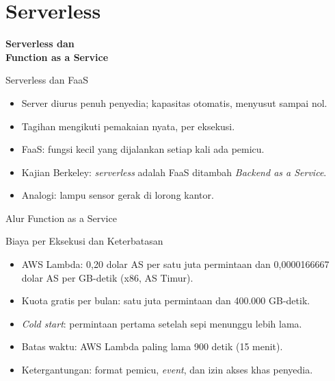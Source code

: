 \documentclass[aspectratio=169, table, 12pt]{beamer}
\begin{document}
\section{Serverless}

\begin{frame}{\hfill}
  \centering
  \Huge{\textbf{Serverless dan\\Function as a Service}}
\end{frame}

\begin{frame}{{\Large Serverless dan FaaS}}
  \vspace{6pt}
  \begin{itemize}
    \item Server diurus penuh penyedia; kapasitas otomatis, menyusut sampai
          nol.
    \item Tagihan mengikuti pemakaian nyata, per eksekusi.
    \item FaaS: fungsi kecil yang dijalankan setiap kali ada pemicu.
    \item Kajian Berkeley: \textit{serverless} adalah FaaS ditambah
          \textit{Backend as a Service}.
    \item Analogi: lampu sensor gerak di lorong kantor.
  \end{itemize}
\end{frame}

\begin{frame}{{\Large Alur Function as a Service}}
  \centering
\end{frame}

\begin{frame}{{\Large Biaya per Eksekusi dan Keterbatasan}}
  \vspace{6pt}
  \begin{itemize}
    \item AWS Lambda: 0,20 dolar AS per satu juta permintaan dan
          0,0000166667 dolar AS per GB-detik (x86, AS Timur).
    \item Kuota gratis per bulan: satu juta permintaan dan 400.000 GB-detik.
    \item \textit{Cold start}: permintaan pertama setelah sepi menunggu lebih
          lama.
    \item Batas waktu: AWS Lambda paling lama 900 detik (15 menit).
    \item Ketergantungan: format pemicu, \textit{event}, dan izin akses khas
          penyedia.
  \end{itemize}
\end{frame}
\end{document}
